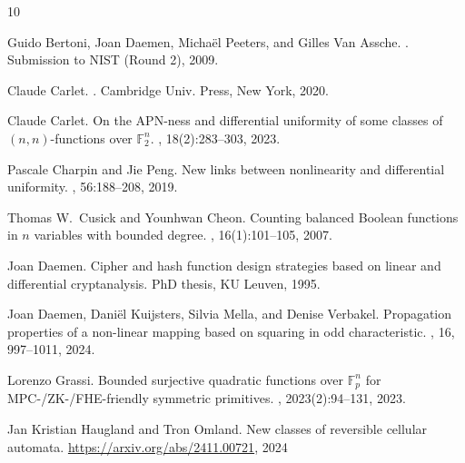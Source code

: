 \documentclass[11pt,english,a4paper]{amsart}
\theoremstyle{plain}
\theoremstyle{definition}
\theoremstyle{remark}
\newcommand{\F}{\mathbb{F}}
\begin{document}
	
	
	\begin{thebibliography}{10}

		Guido Bertoni, Joan Daemen, Micha\"el Peeters, and Gilles Van Assche.
		.
		\newblock Submission to NIST (Round 2), 2009.
  
		Claude Carlet.
		.
		\newblock Cambridge Univ. Press, New York, 2020.


		Claude Carlet.
		\newblock On the {APN}-ness and differential uniformity of some classes of $(n,n)$-functions over $\mathbb{F}_2^n$.
		, 18(2):283--303, 2023.

		Pascale Charpin and Jie Peng.
		\newblock New links between nonlinearity and differential uniformity.
		, 56:188--208, 2019.
        
		Thomas W.\ Cusick and Younhwan Cheon.
		\newblock Counting balanced {Boolean} functions in $n$ variables with bounded degree.
		, 16(1):101--105, 2007.
		
		Joan Daemen.
		\newblock Cipher and hash function design strategies based on linear and differential cryptanalysis.
		\newblock PhD thesis, KU Leuven, 1995.

		Joan Daemen, Dani\"el Kuijsters, Silvia Mella, and Denise Verbakel.
		\newblock Propagation properties of a non-linear mapping based on squaring in odd characteristic.
		, 16, 997--1011, 2024.
  
		Lorenzo Grassi.
		\newblock Bounded surjective quadratic functions over $\F_p^n$ for {MPC}-/{ZK}-/{FHE}-friendly symmetric primitives.
		, 2023(2):94–131, 2023.

		Jan Kristian Haugland and Tron Omland.
		\newblock New classes of reversible cellular automata.
		\newblock \url{https://arxiv.org/abs/2411.00721}, 2024
  

\end{thebibliography}
\end{document}
